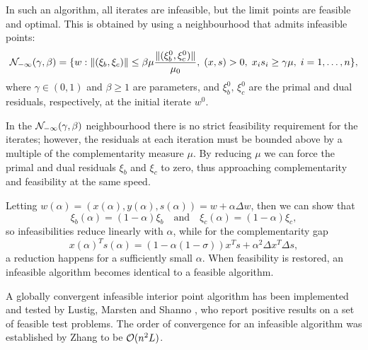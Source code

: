 
In such 
an algorithm, all iterates are infeasible, but the limit points 
are feasible and optimal. This is obtained by using a 
neighbourhood that admits infeasible points:
\[
\mathcal{N}_{-\infty}(\gamma,\beta) =\{ w :
           \|(\xi_b,\xi_c)\| \le \beta\mu \frac{\|(\xi_b^0,\xi_c^0)\|}{\mu_0}, 
	   \; (x,s)>0, \; x_is_i \ge \gamma\mu, \; i = 1, \ldots, n \},
\]
where $\gamma\in (0,1)$ and $\beta \ge 1$ are parameters, and 
$\xi_b^0,\,\xi_c^0$ are the primal and dual residuals, respectively, 
at the initial iterate $w^0$.

In the $\mathcal{N}_{-\infty}(\gamma,\beta)$ neighbourhood
there is no strict feasibility requirement for 
the iterates; however, the residuals at each iteration must be 
bounded above by a multiple of the complementarity measure $\mu$. 
By reducing $\mu$ we can force the primal and dual residuals 
$\xi_b$ and $\xi_c$ to zero, thus approaching complementarity and 
feasibility at the same speed.


Letting 
$w(\alpha) = (x(\alpha),y(\alpha),s(\alpha)) = w + \alpha\Delta w$,
then we can show that
\[
  \xi_b(\alpha) = (1-\alpha) \xi_b \quad \text{and} \quad 
  \xi_c(\alpha) = (1-\alpha) \xi_c,
\]
so infeasibilities reduce linearly with $\alpha$, while for the 
complementarity gap
\[
  x(\alpha)^Ts(\alpha)=(1-\alpha(1 -\sigma))x^Ts +\alpha^2 \Delta x^T \Delta s,
\]
a reduction happens for a sufficiently small $\alpha$. 
When feasibility is restored, an infeasible algorithm becomes identical
to a feasible algorithm. 

A globally convergent infeasible interior point algorithm has
been implemented and tested by Lustig, Marsten and Shanno
\cite{LustigMarstenShanno94b}, who report positive results on
a set of feasible test problems.
The order of convergence for an infeasible algorithm was
established by Zhang \cite{Zhang94} to be $\mathcal{O}(n^2L)$.



